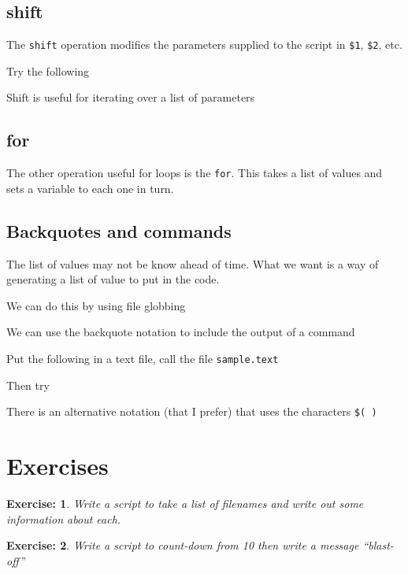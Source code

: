 \documentclass[12pt,a4paper]{article}
\newtheorem{exercise}{Exercise:}
\begin{document}
\subsection{shift}
The \texttt{shift} operation modifies the parameters supplied to the
script in \texttt{\$1}, \texttt{\$2}, etc.

Try the following

Shift is useful for iterating over a list of parameters


\subsection{for}
The other operation useful for loops is the \texttt{for}.
This takes a list of values and sets a variable to each one in turn.


\subsection{Backquotes and commands}
The list of values may not be know ahead of time.  What we want is a
way of generating a list of value to put in the code.

We can do this by using file globbing


We can use the backquote notation to include the output of a command

Put the following in a text file, call the file \texttt{sample.text}




Then try


There is an alternative notation (that I prefer) that uses the
characters \texttt{\$( )}


\section{Exercises}
\begin{exercise}
  Write a script to take a list of filenames and write out some
  information about each.
\end{exercise}

\begin{exercise}
Write a script to count-down from
10 then write a message ``blast-off''
\end{exercise}
\end{document}
